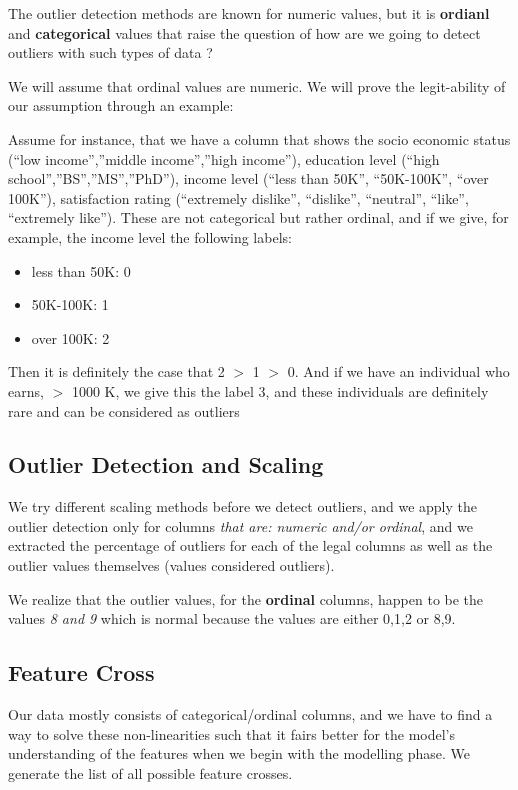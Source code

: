 \documentclass{article}
\begin{document}
\noindent The outlier detection methods are known for numeric values, but it is \textbf{ordianl} and \textbf{categorical} values that raise the question of how are we going to detect outliers with such types of data ?

\noindent We will assume that ordinal values are numeric. We will prove the legit-ability of our assumption through an example:

\noindent Assume for instance, that we have a column that shows the socio economic status (“low income”,”middle income”,”high income”), education level (“high school”,”BS”,”MS”,”PhD”), income level (“less than 50K”, “50K-100K”, “over 100K”), satisfaction rating (“extremely dislike”, “dislike”, “neutral”, “like”, “extremely like”). These are not categorical but rather ordinal, and if we give, for example, the income level the following labels:
\begin{itemize}
    \item less than 50K: 0
    \item 50K-100K: 1
    \item over 100K: 2
\end{itemize}
Then it is definitely the case that 2 $>$ 1 $>$ 0. And if we have an individual who earns, $>$ 1000 K, we give this the label 3, and these individuals are definitely rare and can be considered as outliers

\subsection{Outlier Detection and Scaling}
We try different scaling methods before we detect outliers, and we apply the outlier detection only for columns \textit{that are: numeric and/or ordinal}, and we extracted the percentage of outliers for each of the legal columns as well as the outlier values themselves (values considered outliers).

\noindent We realize that the outlier values, for the \textbf{ordinal} columns, happen to be the values \textit{8 and 9} which is normal because the values are either 0,1,2 or 8,9.

\subsection{Feature Cross}
Our data mostly consists of categorical/ordinal columns, and we have to find a way to solve these non-linearities such that it fairs better for the model's understanding of the features when we begin with the modelling phase. We generate the list of all possible feature crosses. 
\end{document}
